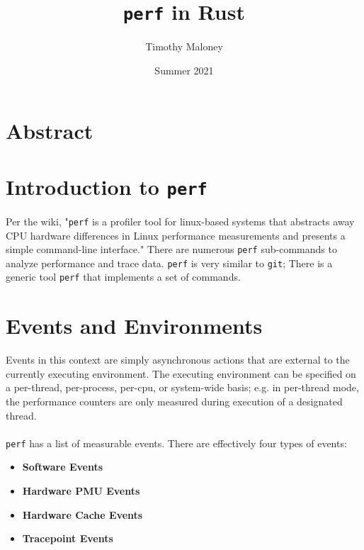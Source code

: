 \documentclass{article}
\title{\texttt{perf} in Rust}
\author{Timothy Maloney}
\date{Summer 2021}
\begin{document}
\maketitle
\section*{Abstract}
\pagebreak
\section{Introduction to \texttt{perf}}
Per the wiki, "\texttt{perf} is a profiler tool for linux-based systems that abstracts away CPU hardware differences in Linux performance measurements and presents a simple command-line interface." There are numerous \texttt{perf} sub-commands to analyze performance and trace data. \texttt{perf} is very similar to \texttt{git}; There is a generic tool \texttt{perf} that
implements a set of commands.
\section{Events and Environments}
Events in this context are simply asynchronous actions that are external to the currently executing environment. The executing environment can be specified on a per-thread, per-process, per-cpu, or system-wide basis; e.g. in per-thread mode, the performance counters are only measured during execution of a designated thread. 
\\\\
\texttt{perf} has a list of measurable events. There are effectively four types of events:
\begin{itemize}
    \item \textbf{Software Events}
    \item \textbf{Hardware PMU Events}
    \item \textbf{Hardware Cache Events}
    \item \textbf{Tracepoint Events}
\end{itemize}
\end{document}
